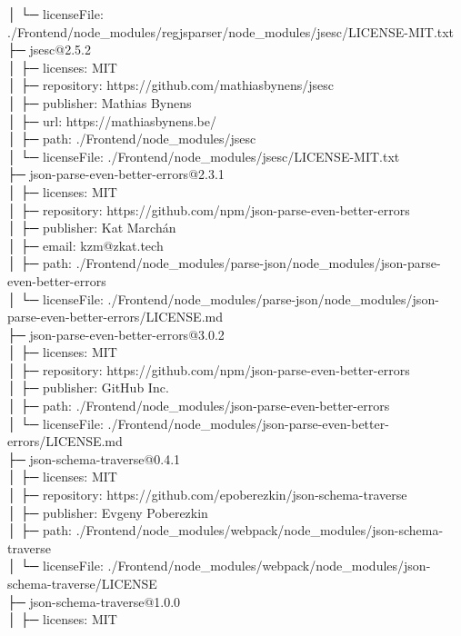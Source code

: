 │  └─ licenseFile: ./Frontend/node\_modules/regjsparser/node\_modules/jsesc/LICENSE-MIT.txt\\
├─ jsesc@2.5.2\\
│  ├─ licenses: MIT\\
│  ├─ repository: https://github.com/mathiasbynens/jsesc\\
│  ├─ publisher: Mathias Bynens\\
│  ├─ url: https://mathiasbynens.be/\\
│  ├─ path: ./Frontend/node\_modules/jsesc\\
│  └─ licenseFile: ./Frontend/node\_modules/jsesc/LICENSE-MIT.txt\\
├─ json-parse-even-better-errors@2.3.1\\
│  ├─ licenses: MIT\\
│  ├─ repository: https://github.com/npm/json-parse-even-better-errors\\
│  ├─ publisher: Kat Marchán\\
│  ├─ email: kzm@zkat.tech\\
│  ├─ path: ./Frontend/node\_modules/parse-json/node\_modules/json-parse-even-better-errors\\
│  └─ licenseFile: ./Frontend/node\_modules/parse-json/node\_modules/json-parse-even-better-errors/LICENSE.md\\
├─ json-parse-even-better-errors@3.0.2\\
│  ├─ licenses: MIT\\
│  ├─ repository: https://github.com/npm/json-parse-even-better-errors\\
│  ├─ publisher: GitHub Inc.\\
│  ├─ path: ./Frontend/node\_modules/json-parse-even-better-errors\\
│  └─ licenseFile: ./Frontend/node\_modules/json-parse-even-better-errors/LICENSE.md\\
├─ json-schema-traverse@0.4.1\\
│  ├─ licenses: MIT\\
│  ├─ repository: https://github.com/epoberezkin/json-schema-traverse\\
│  ├─ publisher: Evgeny Poberezkin\\
│  ├─ path: ./Frontend/node\_modules/webpack/node\_modules/json-schema-traverse\\
│  └─ licenseFile: ./Frontend/node\_modules/webpack/node\_modules/json-schema-traverse/LICENSE\\
├─ json-schema-traverse@1.0.0\\
│  ├─ licenses: MIT\\
